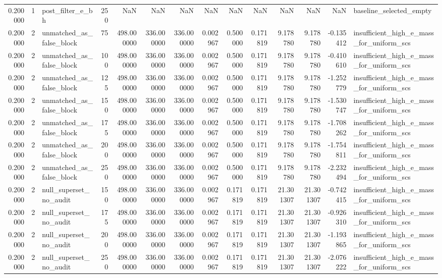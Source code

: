\begin{tabular}{rrlrrrrrrrrrrl}
0.200000 & 1 & post_filter_e_bh & 250 & NaN & NaN & NaN & NaN & NaN & NaN & NaN & NaN & NaN & baseline_selected_empty \\
0.200000 & 2 & unmatched_as_false_block & 75 & 498.000000 & 336.000000 & 336.000000 & 0.002967 & 0.500000 & 0.171819 & 9.178780 & 9.178780 & -0.135412 & insufficient_high_e_mass_for_uniform_scs \\
0.200000 & 2 & unmatched_as_false_block & 100 & 498.000000 & 336.000000 & 336.000000 & 0.002967 & 0.500000 & 0.171819 & 9.178780 & 9.178780 & -0.410610 & insufficient_high_e_mass_for_uniform_scs \\
0.200000 & 2 & unmatched_as_false_block & 125 & 498.000000 & 336.000000 & 336.000000 & 0.002967 & 0.500000 & 0.171819 & 9.178780 & 9.178780 & -1.252779 & insufficient_high_e_mass_for_uniform_scs \\
0.200000 & 2 & unmatched_as_false_block & 150 & 498.000000 & 336.000000 & 336.000000 & 0.002967 & 0.500000 & 0.171819 & 9.178780 & 9.178780 & -1.530747 & insufficient_high_e_mass_for_uniform_scs \\
0.200000 & 2 & unmatched_as_false_block & 175 & 498.000000 & 336.000000 & 336.000000 & 0.002967 & 0.500000 & 0.171819 & 9.178780 & 9.178780 & -1.708262 & insufficient_high_e_mass_for_uniform_scs \\
0.200000 & 2 & unmatched_as_false_block & 200 & 498.000000 & 336.000000 & 336.000000 & 0.002967 & 0.500000 & 0.171819 & 9.178780 & 9.178780 & -1.754811 & insufficient_high_e_mass_for_uniform_scs \\
0.200000 & 2 & unmatched_as_false_block & 250 & 498.000000 & 336.000000 & 336.000000 & 0.002967 & 0.500000 & 0.171819 & 9.178780 & 9.178780 & -2.232494 & insufficient_high_e_mass_for_uniform_scs \\
0.200000 & 2 & null_superset_no_audit & 150 & 498.000000 & 336.000000 & 336.000000 & 0.002967 & 0.171819 & 0.171819 & 21.301307 & 21.301307 & -0.742415 & insufficient_high_e_mass_for_uniform_scs \\
0.200000 & 2 & null_superset_no_audit & 175 & 498.000000 & 336.000000 & 336.000000 & 0.002967 & 0.171819 & 0.171819 & 21.301307 & 21.301307 & -0.926310 & insufficient_high_e_mass_for_uniform_scs \\
0.200000 & 2 & null_superset_no_audit & 200 & 498.000000 & 336.000000 & 336.000000 & 0.002967 & 0.171819 & 0.171819 & 21.301307 & 21.301307 & -1.193865 & insufficient_high_e_mass_for_uniform_scs \\
0.200000 & 2 & null_superset_no_audit & 250 & 498.000000 & 336.000000 & 336.000000 & 0.002967 & 0.171819 & 0.171819 & 21.301307 & 21.301307 & -2.076222 & insufficient_high_e_mass_for_uniform_scs \\

\end{tabular}
